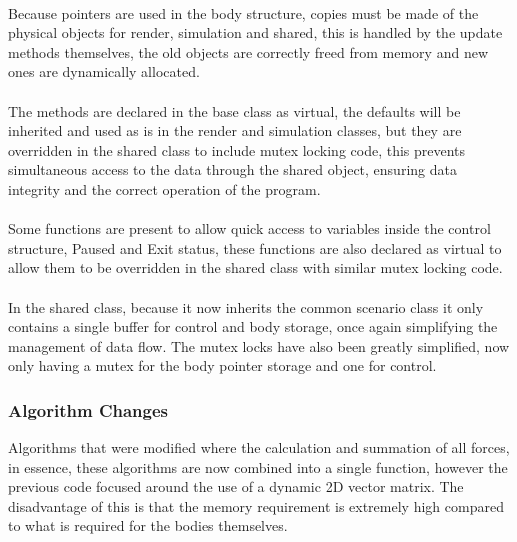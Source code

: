 \paragraph{}
Because pointers are used in the body structure, copies must be made of the physical objects for render, simulation and shared, this is handled by the update methods themselves, the old objects are correctly freed from memory and new ones are dynamically allocated.

\paragraph{}
The methods are declared in the base class as virtual, the defaults will be inherited and used as is in the render and simulation classes, but they are overridden in the shared class to include mutex locking code, this prevents simultaneous access to the data through the shared object, ensuring data integrity and the correct operation of the program.

\paragraph{}
Some functions are present to allow quick access to variables inside the control structure, Paused and Exit status, these functions are also declared as virtual to allow them to be overridden in the shared class with similar mutex locking code.

\paragraph{}
In the shared class, because it now inherits the common scenario class it only contains a single buffer for control and body storage, once again simplifying the management of data flow. The mutex locks have also been greatly simplified, now only having a mutex for the body pointer storage and one for control.

\subsubsection{Algorithm Changes}
Algorithms that were modified where the calculation and summation of all forces, in essence, these algorithms are now combined into a single function, however the previous code focused around the use of a dynamic 2D vector matrix. The disadvantage of this is that the memory requirement is extremely high compared to what is required for the bodies themselves. 


